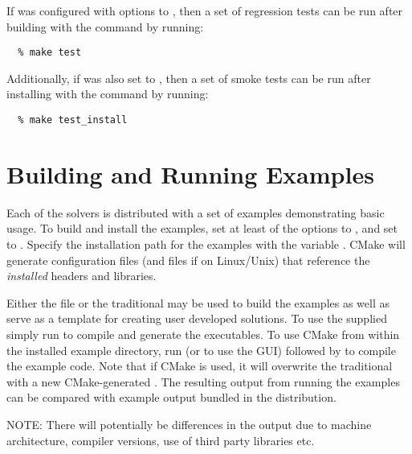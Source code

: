 If {\sundials} was configured with
 options to , then a set of
regression tests can be run after building with the  command
by running:
\begin{verbatim}
  % make test
\end{verbatim}
Additionally, if  was also set to , then
a set of smoke tests can be run after installing with the 
command by running:
\begin{verbatim}
  % make test_install
\end{verbatim}

\section{Building and Running Examples}
Each of the {\sundials} solvers is distributed with a set of examples
demonstrating basic usage. To build and install the examples, set at least of
the  options to , and set
 to .  Specify the installation path for the
examples with the variable . CMake will generate
 configuration files (and  files if on
Linux/Unix) that reference the {\em installed} {\sundials} headers and
libraries.

Either the  file or the traditional  may be used
to build the examples as well as serve as a template for creating user developed
solutions.  To use the supplied  simply run  to compile
and generate the executables.  To use CMake from within the installed example
directory, run  (or  to use the GUI) followed by 
to compile the example code.  Note that if CMake is used, it will overwrite the
traditional  with a new CMake-generated .  The
resulting output from running the examples can be compared with example output
bundled in the {\sundials} distribution.

\noindent NOTE: There will potentially be differences in the output due to
machine architecture, compiler versions, use of third party libraries
etc.{\warn}


